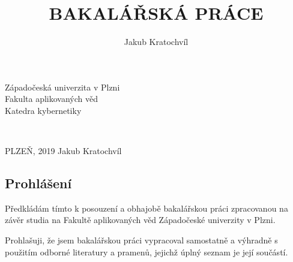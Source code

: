\documentclass[12pt,a4paper]{report}
\begin{document}
\title{BAKALÁŘSKÁ PRÁCE}
\author{Jakub Kratochvíl}
\begin{titlepage}
\begin{center}
\begin{LARGE}
\vspace*{1cm}
Západočeská univerzita v Plzni \\
Fakulta aplikovaných věd \\
Katedra kybernetiky \\
\end{LARGE}

\vspace{6cm}
\begin{huge}
\textbf{\thetitle}\\
\end{huge}
\vspace{2cm}
\end{center}
\vspace{7cm}
\begin{large}
\noindent
PLZEŇ, 2019 \hfill Jakub Kratochvíl

\end{large}

\end{titlepage}
\newpage

\pagestyle{empty}		

\newpage

\newpage
\pagestyle{plain}
\setcounter{page}{1}

\vspace*{1cm}
\subsection*{Prohlášení}

\vspace{2cm}
Předkládám  tímto  k posouzení  a  obhajobě  bakalářskou  práci  zpracovanou  na závěr studia na Fakultě aplikovaných věd Západočeské univerzity v Plzni. \\
\vspace*{0.5cm}

\noindent
Prohlašuji,  že  jsem  bakalářskou  práci  vypracoval  samostatně  a  výhradně s použitím odborné literatury a pramenů, jejichž úplný seznam je její součástí. \\
\end{document}

